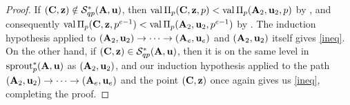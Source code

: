 \documentclass{amsart}
\begin{document}
\begin{proof}
   If $(\mathbf{C},\mathbf{z}) \notin \mathcal{S}^{\ast}_{qp}(\mathbf{A},\mathbf{u})$, then $\operatorname{val} \Pi_p(\mathbf{C},\mathbf{z}, p)< \operatorname{val} \Pi_p(\mathbf{A}_2, \mathbf{u}_2, p)$ by , and consequently $\operatorname{val} \Pi_p(\mathbf{C}, \mathbf{z},p^{e-1}) < \operatorname{val}\Pi_p(\mathbf{A}_2,\mathbf{u}_2, p^{e-1})$ by .
   The induction hypothesis applied to $(\mathbf{A}_2, \mathbf{u}_2) \to \cdots \to (\mathbf{A}_e, \mathbf{u}_e)$ and $(\mathbf{A}_2,\mathbf{u}_2)$ itself gives \eqref{ineq}.
   On the other hand, if $(\mathbf{C}, \mathbf{z}) \in \mathcal{S}^{\ast}_{qp}(\mathbf{A},\mathbf{u})$, then it is on the same level in $\operatorname{sprout}_p^{\ast}(\mathbf{A},\mathbf{u})$ as $(\mathbf{A}_2, \mathbf{u}_2)$, and  our induction hypothesis applied to the path $(\mathbf{A}_2, \mathbf{u}_2) \to \cdots \to (\mathbf{A}_e, \mathbf{u}_e)$ and the point $(\mathbf{C}, \mathbf{z})$ once again gives us \eqref{ineq}, completing the proof.
\end{proof}

\end{document}
